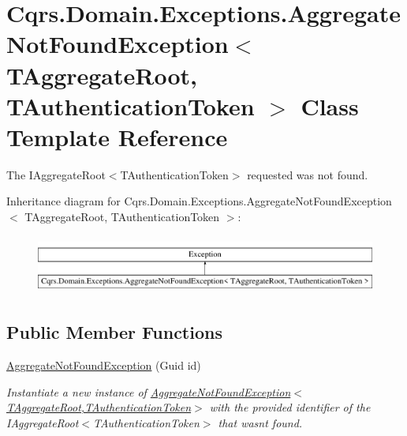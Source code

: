 \hypertarget{classCqrs_1_1Domain_1_1Exceptions_1_1AggregateNotFoundException}{}\section{Cqrs.\+Domain.\+Exceptions.\+Aggregate\+Not\+Found\+Exception$<$ T\+Aggregate\+Root, T\+Authentication\+Token $>$ Class Template Reference}
\label{classCqrs_1_1Domain_1_1Exceptions_1_1AggregateNotFoundException}


The I\+Aggregate\+Root$<$\+T\+Authentication\+Token$>$ requested was not found.  


Inheritance diagram for Cqrs.\+Domain.\+Exceptions.\+Aggregate\+Not\+Found\+Exception$<$ T\+Aggregate\+Root, T\+Authentication\+Token $>$\+:\begin{figure}[H]
\begin{center}
\leavevmode
\includegraphics[height=1.947826cm]{classCqrs_1_1Domain_1_1Exceptions_1_1AggregateNotFoundException}
\end{center}
\end{figure}
\subsection*{Public Member Functions}
\begin{DoxyCompactItemize}
\item 
\hyperlink{classCqrs_1_1Domain_1_1Exceptions_1_1AggregateNotFoundException_a44057befbb31c652727d04c5b34211ee_a44057befbb31c652727d04c5b34211ee}{Aggregate\+Not\+Found\+Exception} (Guid id)
\begin{DoxyCompactList}\small\item\em Instantiate a new instance of \hyperlink{classCqrs_1_1Domain_1_1Exceptions_1_1AggregateNotFoundException_a44057befbb31c652727d04c5b34211ee_a44057befbb31c652727d04c5b34211ee}{Aggregate\+Not\+Found\+Exception$<$\+T\+Aggregate\+Root,\+T\+Authentication\+Token$>$} with the provided identifier of the I\+Aggregate\+Root$<$\+T\+Authentication\+Token$>$ that wasn\textquotesingle{}t found. \end{DoxyCompactList}\end{DoxyCompactItemize}


